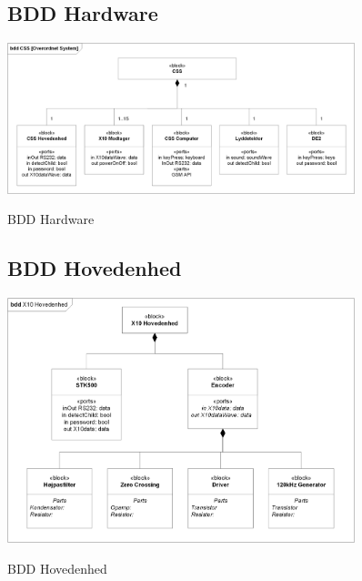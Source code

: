 \begin{figure}[htbp] \centering
\subsection{BDD Hardware}
{\includegraphics[width=0.9\textwidth]{billeder/diagrammer/BDD_Hardware}}
\caption{BDD Hardware}
\label{lab:bddhardware}
\end{figure}

\begin{figure}[htbp] \centering
\subsection{BDD Hovedenhed}
{\includegraphics[width=0.9\textwidth]{billeder/diagrammer/BDD_Hovedenhed}}
\caption{BDD Hovedenhed}
\label{lab:bddhovedenhed}
\end{figure}


